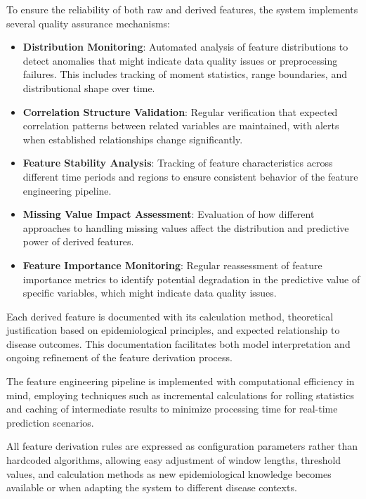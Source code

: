 \documentclass[12pt,a4paper]{report}
\begin{document}
To ensure the reliability of both raw and derived features, the system implements several quality assurance mechanisms:

\begin{itemize}
    \item \textbf{Distribution Monitoring}: Automated analysis of feature distributions to detect anomalies that might indicate data quality issues or preprocessing failures. This includes tracking of moment statistics, range boundaries, and distributional shape over time.
    
    \item \textbf{Correlation Structure Validation}: Regular verification that expected correlation patterns between related variables are maintained, with alerts when established relationships change significantly.
    
    \item \textbf{Feature Stability Analysis}: Tracking of feature characteristics across different time periods and regions to ensure consistent behavior of the feature engineering pipeline.
    
    \item \textbf{Missing Value Impact Assessment}: Evaluation of how different approaches to handling missing values affect the distribution and predictive power of derived features.
    
    \item \textbf{Feature Importance Monitoring}: Regular reassessment of feature importance metrics to identify potential degradation in the predictive value of specific variables, which might indicate data quality issues.
\end{itemize}

Each derived feature is documented with its calculation method, theoretical justification based on epidemiological principles, and expected relationship to disease outcomes. This documentation facilitates both model interpretation and ongoing refinement of the feature derivation process.

The feature engineering pipeline is implemented with computational efficiency in mind, employing techniques such as incremental calculations for rolling statistics and caching of intermediate results to minimize processing time for real-time prediction scenarios.

All feature derivation rules are expressed as configuration parameters rather than hardcoded algorithms, allowing easy adjustment of window lengths, threshold values, and calculation methods as new epidemiological knowledge becomes available or when adapting the system to different disease contexts.
\end{document}
